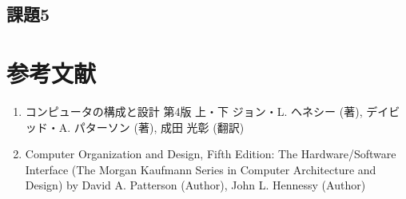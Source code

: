 \documentclass[a4j]{jarticle}
\begin{document}
\subsection{課題5}

%  


%
%

\section{参考文献}

\begin{enumerate}
\item コンピュータの構成と設計 第4版 上・下 ジョン・L. ヘネシー (著), デイビッド・A. パターソン (著), 成田 光彰 (翻訳)
\item Computer Organization and Design, Fifth Edition: The Hardware/Software Interface (The Morgan Kaufmann Series in Computer Architecture and Design) by David A. Patterson (Author), John L. Hennessy  (Author)
\end{enumerate}
\end{document}
